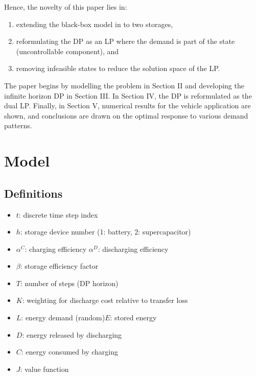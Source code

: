 \documentclass[conference]{IEEEtran}
\begin{document}

Hence, the novelty of this paper lies in:
\begin{enumerate}
    \item extending the black-box model in \cite{su2013modeling} to two storages,
    \item reformulating the DP as an LP where the demand is part of the state (uncontrollable component), and
    \item removing infeasible states to reduce the solution space of the LP.
\end{enumerate} The paper begins by modelling the problem in Section II and developing the infinite horizon DP in Section III. In Section IV, the DP is reformulated as the dual LP. Finally, in Section V, numerical results for the vehicle application are shown, and conclusions are drawn on the optimal response to various demand patterns. 



\section{Model}

\subsection{Definitions}
\begin{itemize}
	\item $t$: discrete time step index
	\item $h$: storage device number (1: battery, 2: supercapacitor)
	\item $\alpha^{C}$: charging efficiency\hspace{1em}
	$\alpha^{D}$: discharging efficiency
	\item $\beta$: storage efficiency factor
	\item $T$: number of steps (DP horizon)
	\item $K$: weighting for discharge cost relative to transfer loss
	\item $L$: energy demand (random)\hspace{1em}$E$: stored energy
	\item $D$: energy released by discharging
	\item $C$: energy consumed by charging
	\item $J$: value function
\end{itemize}
\end{document}
